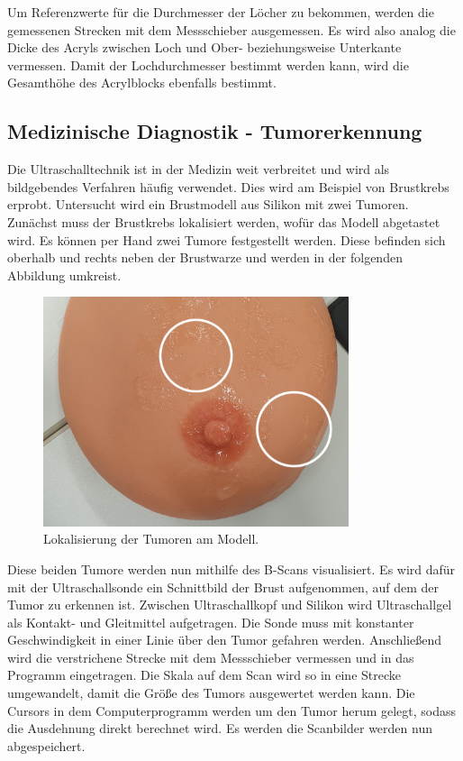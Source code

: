\noindent Um Referenzwerte für die Durchmesser der Löcher zu bekommen, werden die gemessenen Strecken 
mit dem Messschieber ausgemessen. Es wird also analog die Dicke des Acryls zwischen Loch und Ober- 
beziehungsweise Unterkante vermessen. Damit der Lochdurchmesser bestimmt werden kann, wird die 
Gesamthöhe des Acrylblocks ebenfalls bestimmt. 


\subsection{Medizinische Diagnostik - Tumorerkennung}
Die Ultraschalltechnik ist in der Medizin weit verbreitet und wird als bildgebendes Verfahren häufig 
verwendet. Dies wird am Beispiel von Brustkrebs erprobt. Untersucht wird ein Brustmodell aus Silikon 
mit zwei Tumoren. Zunächst muss der Brustkrebs lokalisiert werden, wofür das Modell abgetastet wird. 
Es können per Hand zwei Tumore festgestellt werden. Diese befinden sich oberhalb und rechts neben 
der Brustwarze und werden in der folgenden Abbildung umkreist. 

\begin{figure}[H]
    \centering
    \includegraphics[width = 0.8\textwidth]{Tumororientierung2.jpg}
    \caption{Lokalisierung der Tumoren am Modell.}
\end{figure}
 
\noindent Diese beiden Tumore werden nun mithilfe des B-Scans visualisiert. Es wird dafür mit der 
Ultraschallsonde ein Schnittbild der Brust aufgenommen, auf dem der Tumor zu erkennen ist. Zwischen 
Ultraschallkopf und Silikon wird Ultraschallgel als Kontakt- und Gleitmittel aufgetragen. Die Sonde 
muss mit konstanter Geschwindigkeit in einer Linie über den Tumor gefahren werden. Anschließend wird 
die verstrichene Strecke mit dem Messschieber vermessen und in das Programm eingetragen. Die Skala 
auf dem Scan wird so in eine Strecke umgewandelt, damit die Größe des Tumors ausgewertet werden kann.
Die Cursors in dem Computerprogramm werden um den Tumor herum gelegt, sodass die Ausdehnung direkt 
berechnet wird. Es werden die Scanbilder werden nun abgespeichert. 


